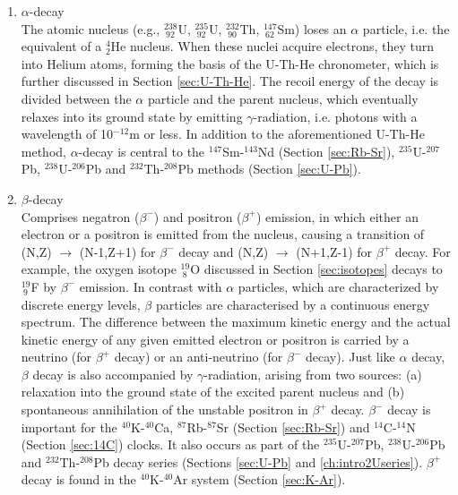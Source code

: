 \begin{enumerate}
\item{$\alpha$-decay}\\ The atomic nucleus (e.g., $^{238}_{~92}$U,
  $^{235}_{~92}$U, $^{232}_{~90}$Th, $^{147}_{~62}$Sm) loses an
  $\alpha$ particle, i.e. the equivalent of a $^4_2$He nucleus. When
  these nuclei acquire electrons, they turn into Helium atoms, forming
  the basis of the U-Th-He chronometer, which is further discussed in
  Section \ref{sec:U-Th-He}. The recoil energy of the decay is divided
  between the $\alpha$ particle and the parent nucleus, which
  eventually relaxes into its ground state by emitting
  $\gamma$-radiation, i.e. photons with a wavelength of 10$^{-12}$m or
  less.  In addition to the aforementioned U-Th-He method,
  $\alpha$-decay is central to the $^{147}$Sm-$^{143}$Nd (Section
  \ref{sec:Rb-Sr}), $^{235}$U-$^{207}$Pb, $^{238}$U-$^{206}$Pb and
  $^{232}$Th-$^{208}$Pb methods (Section \ref{sec:U-Pb}).

\item{$\beta$-decay}\\ Comprises negatron ($\beta^-$) and positron
  ($\beta^+$) emission, in which either an electron or a positron is
  emitted from the nucleus, causing a transition of (N,Z)
  $\rightarrow$ (N-1,Z+1) for $\beta^-$ decay and (N,Z) $\rightarrow$
  (N+1,Z-1) for $\beta^+$ decay. For example, the oxygen isotope
  $^{19}_{~8}$O discussed in Section \ref{sec:isotopes} decays to
  $^{19}_{~9}$F by $\beta^-$ emission.  In contrast with $\alpha$
  particles, which are characterized by discrete energy levels,
  $\beta$ particles are characterised by a continuous energy
  spectrum. The difference between the maximum kinetic energy and the
  actual kinetic energy of any given emitted electron or positron is
  carried by a neutrino (for $\beta^+$ decay) or an anti-neutrino (for
  $\beta^-$ decay). Just like $\alpha$ decay, $\beta$ decay is also
  accompanied by $\gamma$-radiation, arising from two sources: (a)
  relaxation into the ground state of the excited parent nucleus and
  (b) spontaneous annihilation of the unstable positron in $\beta^+$
  decay. $\beta^-$ decay is important for the $^{40}$K-$^{40}$Ca,
  $^{87}$Rb-$^{87}$Sr (Section \ref{sec:Rb-Sr}) and $^{14}$C-$^{14}$N
  (Section \ref{sec:14C}) clocks. It also occurs as part of the
  $^{235}$U-$^{207}$Pb, $^{238}$U-$^{206}$Pb and $^{232}$Th-$^{208}$Pb
  decay series (Sections \ref{sec:U-Pb} and
  \ref{ch:intro2Useries}). $\beta^+$ decay is found in the
  $^{40}$K-$^{40}$Ar system (Section \ref{sec:K-Ar}).


\end{enumerate}
